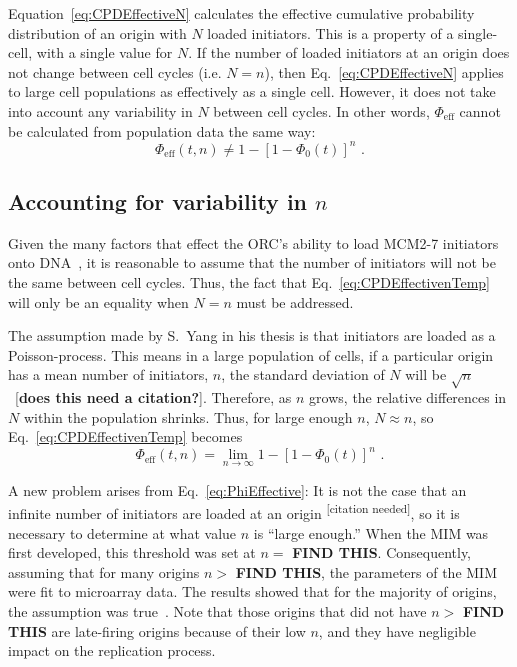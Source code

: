 		Equation~\ref{eq:CPDEffectiveN} calculates the effective cumulative probability distribution of an origin with $N$ loaded initiators.
		This is a property of a single-cell, with a single value for $N$.
		If the number of loaded initiators at an origin does not change between cell cycles (i.e. $N=n$), then Eq.~\ref{eq:CPDEffectiveN} applies to large cell populations as effectively as a single cell.
		However, it does not take into account any variability in $N$ between cell cycles.
		In other words, $\Phi_{\text{eff}}$ cannot be calculated from population data the same way:
		\begin{equation} \label{eq:CPDEffectivenTemp}
			\Phi_{\text{eff}}(t,n) \neq 1 - \left[1 - \Phi_0(t)\right]^n\text{ .}
		\end{equation}
		
		
		\subsection{Accounting for variability in $n$}
		\label{subsec:VariableN}
		
		Given the many factors that effect the ORC's ability to load MCM2-7 initiators onto DNA~\cite{MultiMCM}, it is reasonable to assume that the number of initiators will not be the same between cell cycles.
		Thus, the fact that Eq.~\ref{eq:CPDEffectivenTemp} will only be an equality when $N=n$ must be addressed.
		
		The assumption made by S.~Yang in his thesis is that initiators are loaded as a Poisson-process.
		This means in a large population of cells, if a particular origin has a mean number of initiators, $n$, the standard deviation of $N$ will be $\sqrt{n}$~[\textbf{does this need a citation?}].
		Therefore, as $n$ grows, the relative differences in $N$ within the population shrinks.
		Thus, for large enough $n$, $N\approx n$, so Eq.~\ref{eq:CPDEffectivenTemp} becomes
		\begin{equation} \label{eq:PhiEffective}
			\Phi_{\text{eff}}(t,n) = \lim_{n\to\infty} 1 - \left[1 - \Phi_0(t)\right]^n\text{ .}
		\end{equation}
		
		A new problem arises from Eq.~\ref{eq:PhiEffective}:
		It is not the case that an infinite number of initiators are loaded at an origin \textsuperscript{[citation needed]}, so it is necessary to determine at what value $n$ is ``large enough.''
		When the MIM was first developed, this threshold was set at $n=$ \textbf{FIND THIS}.
		Consequently, assuming that for many origins $n>$ \textbf{FIND THIS}, the parameters of the MIM were fit to microarray data.
		The results showed that for the majority of origins, the assumption was true~\cite{ScottsThesis}.
		Note that those origins that did not have $n>$ \textbf{FIND THIS} are late-firing origins because of their low $n$, and they have negligible impact on the replication process.
		
